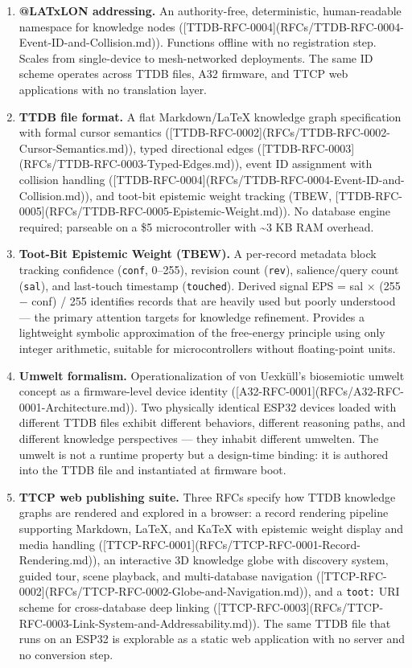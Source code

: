 \documentclass[11pt]{article}
\begin{document}
\begin{enumerate}[leftmargin=*, label=\textbf{\arabic*.}]

\item \textbf{@LATxLON addressing.}
An authority-free, deterministic, human-readable namespace for knowledge nodes ([TTDB-RFC-0004](RFCs/TTDB-RFC-0004-Event-ID-and-Collision.md)). Functions offline with no registration step. Scales from single-device to mesh-networked deployments. The same ID scheme operates across TTDB files, A32 firmware, and TTCP web applications with no translation layer.
\item \textbf{TTDB file format.}
A flat Markdown/LaTeX knowledge graph specification with formal cursor semantics ([TTDB-RFC-0002](RFCs/TTDB-RFC-0002-Cursor-Semantics.md)), typed directional edges ([TTDB-RFC-0003](RFCs/TTDB-RFC-0003-Typed-Edges.md)), event ID assignment with collision handling ([TTDB-RFC-0004](RFCs/TTDB-RFC-0004-Event-ID-and-Collision.md)), and toot-bit epistemic weight tracking (TBEW, [TTDB-RFC-0005](RFCs/TTDB-RFC-0005-Epistemic-Weight.md)). No database engine required; parseable on a \$5 microcontroller with \textasciitilde{}3 KB RAM overhead.
\item \textbf{Toot-Bit Epistemic Weight (TBEW).}
A per-record metadata block tracking confidence (\texttt{conf}, 0--255), revision count (\texttt{rev}), salience/query count (\texttt{sal}), and last-touch timestamp (\texttt{touched}). Derived signal EPS = sal $\times$ (255 $-$ conf) / 255 identifies records that are heavily used but poorly understood --- the primary attention targets for knowledge refinement. Provides a lightweight symbolic approximation of the free-energy principle using only integer arithmetic, suitable for microcontrollers without floating-point units.
\item \textbf{Umwelt formalism.}
Operationalization of von Uexküll's biosemiotic umwelt concept as a firmware-level device identity ([A32-RFC-0001](RFCs/A32-RFC-0001-Architecture.md)). Two physically identical ESP32 devices loaded with different TTDB files exhibit different behaviors, different reasoning paths, and different knowledge perspectives --- they inhabit different umwelten. The umwelt is not a runtime property but a design-time binding: it is authored into the TTDB file and instantiated at firmware boot.
\item \textbf{TTCP web publishing suite.}
Three RFCs specify how TTDB knowledge graphs are rendered and explored in a browser: a record rendering pipeline supporting Markdown, LaTeX, and KaTeX with epistemic weight display and media handling ([TTCP-RFC-0001](RFCs/TTCP-RFC-0001-Record-Rendering.md)), an interactive 3D knowledge globe with discovery system, guided tour, scene playback, and multi-database navigation ([TTCP-RFC-0002](RFCs/TTCP-RFC-0002-Globe-and-Navigation.md)), and a \texttt{toot:} URI scheme for cross-database deep linking ([TTCP-RFC-0003](RFCs/TTCP-RFC-0003-Link-System-and-Addressability.md)). The same TTDB file that runs on an ESP32 is explorable as a static web application with no server and no conversion step.

\end{enumerate}
\end{document}
